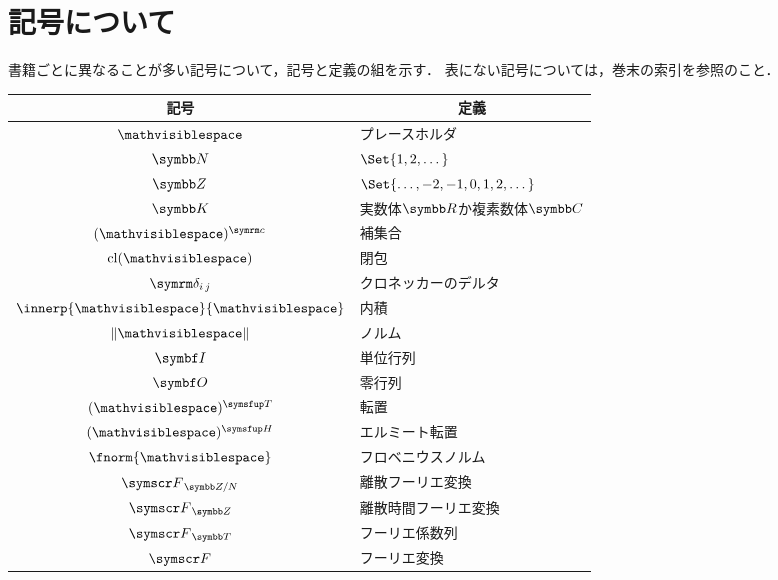 \documentclass[../../main]{subfiles}
\begin{document}
\chapter{記号について}
\thispagestyle{empty}
書籍ごとに異なることが多い記号について，記号と定義の組を示す．
表にない記号については，巻末の索引を参照のこと．

\vspace*{\fill}
\begin{table*}
  \centering
  \begin{tabular}{c|l} \hline
    記号 & \multicolumn{1}{c}{定義} \\ \hline
    \(\holder\) & プレースホルダ \\
    \(\numset{N}\) & \(\Set{1,2,\dotsc}\) \\
    \(\numset{Z}\) & \(\Set{\dotsc,-2,-1,0,1,2,\dotsc}\) \\
    \(\numset{K}\) & 実数体\(\numset{R}\)か複素数体\(\numset{C}\) \\
    \(\scomp{\pholder}\) & 補集合 \\
    \(\clsr\pholder\) & 閉包 \\
    \(\kdelta{i}{j}\) & クロネッカーのデルタ \\
    \(\innerp{\holder}{\holder}\) & 内積 \\
    \(\vnorm{\holder}\) & ノルム \\
    \(\imat\) & 単位行列 \\
    \(\zmat\) & 零行列 \\
    \(\trps{\pholder}\) & 転置 \\
    \(\htrps{\pholder}\) & エルミート転置 \\
    \(\fnorm{\holder}\) & フロベニウスノルム \\
    \(\dft{N}\) & 離散フーリエ変換 \\
    \(\dtft\) & 離散時間フーリエ変換 \\
    \(\fseries\) & フーリエ係数列 \\
    \(\ftrans\) & フーリエ変換 \\ \hline
  \end{tabular}
\end{table*}
\vspace*{\fill}
\end{document}
